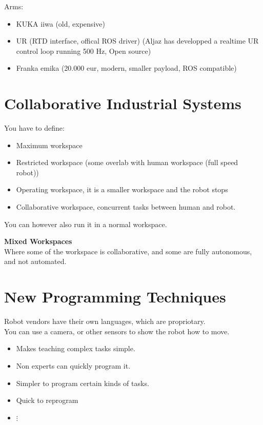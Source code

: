 \documentclass[a4paper]{article}
\begin{document}
Arms:
\begin{itemize}
	\item KUKA iiwa (old, expensive)
	\item UR (RTD interface, offical ROS driver) (Aljaz has developped a realtime UR control loop running 500 Hz, Open source)
	\item Franka emika (20.000 eur, modern, smaller payload, ROS compatible)
\end{itemize}

\section{Collaborative Industrial Systems}
You have to define:
\begin{itemize}
	\item Maximum workspace
	\item Restricted workspace (some overlab with human workspace (full speed robot))
	\item Operating workspace, it is a smaller workspace and the robot stops
	\item Collaborative workspace, concurrent tasks between human and robot.
\end{itemize}
You can however also run it in a normal workspace.

\vspace{5pt}


\textbf{Mixed Workspaces} \\
Where some of the workspace is collaborative, and some are fully autonomous, and not automated.

\section{New Programming Techniques}
Robot vendors have their own languages, which are propriotary. \\
You can use a camera, or other sensors to show the robot how to move.
\begin{itemize}
	\item Makes teaching complex tasks simple.
	\item Non experts can quickly program it.
	\item Simpler to program certain kinds of tasks.
	\item Quick to reprogram
	\item $ \vdots $
\end{itemize}
\end{document}
